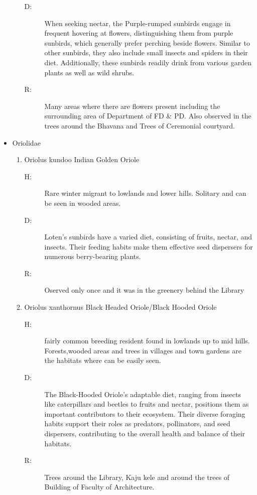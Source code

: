 \begin{itemize}
\begin{enumerate}
\begin{description}
\item[D: ]%
When seeking nectar, the Purple{-}rumped sunbirds engage in frequent hovering at flowers, distinguishing them from purple sunbirds, which generally prefer perching beside flowers. Similar to other sunbirds, they also include small insects and spiders in their diet. Additionally, these sunbirds readily drink from various garden plants as well as wild shrubs.%
\item[R: ]%
Many areas where there are flowers present including the surrounding area of Department of FD \& PD. Also observed in the trees around the Bhavana and Trees of Ceremonial courtyard.%
\end{description}%
\end{enumerate}%
\item%
Oriolidae%
\begin{enumerate}%
\item%
Oriolus kundoo\newline%
Indian Golden Oriole%
\begin{description}%
\item[H: ]%
Rare winter migrant to lowlands and lower hills. Solitary and can be seen in wooded areas.%
\item[D: ]%
Loten's sunbirds have a varied diet, consisting of fruits, nectar, and insects. Their feeding habits make them effective seed dispersers for numerous berry{-}bearing plants.%
\item[R: ]%
Oserved only once and it was in the greenery behind the Library%
\end{description}%
\item%
Oriolus xanthornus\newline%
Black Headed Oriole/Black Hooded Oriole%
\begin{description}%
\item[H: ]%
fairly common breeding resident found in lowlands up to mid hills. Forests,wooded areas and trees in villages and town gardens are the habitats where can be easily seen.%
\item[D: ]%
The Black{-}Hooded Oriole's adaptable diet, ranging from insects like caterpillars and beetles to fruits and nectar, positions them as important contributors to their ecosystem. Their diverse foraging habits support their roles as predators, pollinators, and seed dispersers, contributing to the overall health and balance of their habitats.%
\item[R: ]%
Trees around the Library, Kaju kele and around the trees of Building of Faculty of Architecture.%

\end{description}
\end{enumerate}
\end{itemize}

